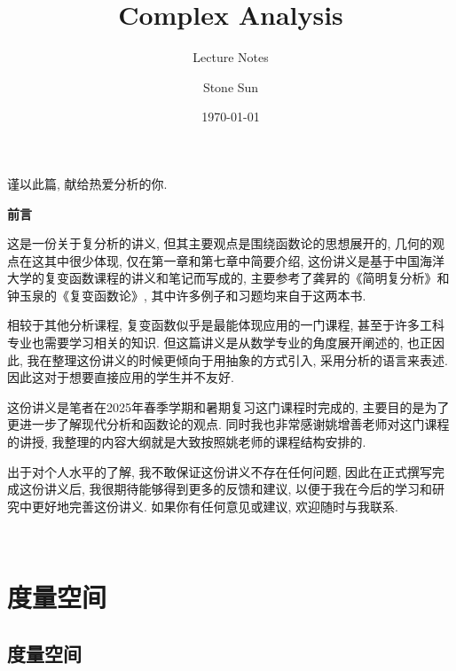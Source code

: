 \documentclass[theorem=false,mathfont=none,openany,sub3section]{easybook}
\title{Complex Analysis}
\subtitle{Lecture Notes}
\author{Stone Sun}
\date{\today}
\renewcommand{\rmdefault}{lmr}
\newcommand{\btocgroup}[1][toc]{\addtocontents{#1}{\string\begingroup}}
\newcommand{\etocgroup}[1][toc]{\addtocontents{#1}{\string\endgroup}}
\begin{document}
\maketitle
\begin{center}
谨以此篇, 献给热爱分析的你.\par
\end{center}
\frontmatter

\begingroup
\renewcommand{\familydefault}{\rmdefault}
\tableofcontents
\endgroup

\newpage
\begin{center}
\Large
\textbf{前言}\par
\end{center}

\hspace{2em}

这是一份关于复分析的讲义, 但其主要观点是围绕函数论的思想展开的, 几何的观点在这其中很少体现, 仅在第一章和第七章中简要介绍, 这份讲义是基于中国海洋大学的复变函数课程的讲义和笔记而写成的, 主要参考了龚昇的《简明复分析》和钟玉泉的《复变函数论》, 其中许多例子和习题均来自于这两本书.\par
相较于其他分析课程, 复变函数似乎是最能体现应用的一门课程, 甚至于许多工科专业也需要学习相关的知识. 但这篇讲义是从数学专业的角度展开阐述的, 也正因此, 我在整理这份讲义的时候更倾向于用抽象的方式引入, 采用分析的语言来表述. 因此这对于想要直接应用的学生并不友好.\par
这份讲义是笔者在2025年春季学期和暑期复习这门课程时完成的, 主要目的是为了更进一步了解现代分析和函数论的观点. 同时我也非常感谢姚增善老师对这门课程的讲授, 我整理的内容大纲就是大致按照姚老师的课程结构安排的.\par
出于对个人水平的了解, 我不敢保证这份讲义不存在任何问题, 因此在正式撰写完成这份讲义后, 我很期待能够得到更多的反馈和建议, 以便于我在今后的学习和研究中更好地完善这份讲义. 如果你有任何意见或建议, 欢迎随时与我联系.\par

\begin{flushright}
\\
\text{\today}
\end{flushright}

\mainmatter

\btocgroup
{}
\chapter{度量空间}
\etocgroup

\section{度量空间}
\end{document}
